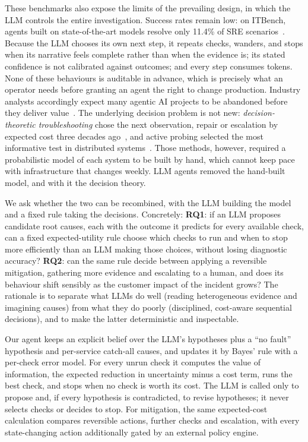 These benchmarks also expose the limits of the prevailing design, in which the LLM
controls the entire investigation. Success rates remain low: on ITBench, agents built on state-of-the-art models
resolve only 11.4\% of SRE scenarios~\cite{jha2025itbench}.
Because the LLM chooses its own next step, it repeats checks, wanders, and stops
when its narrative feels complete rather than when the evidence is; its stated
confidence is not calibrated against outcomes; and every step consumes tokens.
None of these behaviours is auditable in advance, which is precisely what an
operator needs before granting an agent the right to change production. Industry
analysts accordingly expect many agentic AI projects to be abandoned before they
deliver value~\cite{gartner2025agentic}. The underlying decision problem is not new:
\emph{decision-theoretic troubleshooting} chose the next observation, repair or
escalation by expected cost three decades ago~\cite{heckerman1995decision,breese1996decision,langseth2003decision},
and active probing selected the most informative test in distributed
systems~\cite{rish2005adaptive}. Those methods, however, required a probabilistic
model of each system to be built by hand, which cannot keep pace with
infrastructure that changes weekly. LLM agents removed the hand-built model, and
with it the decision theory.

We ask whether the two can be recombined, with the LLM building the model and a
fixed rule taking the decisions. Concretely:
\textbf{RQ1}: if an LLM proposes candidate root causes, each with the outcome it
predicts for every available check, can a fixed expected-utility rule choose which
checks to run and when to stop more efficiently than an LLM making those choices,
without losing diagnostic accuracy?
\textbf{RQ2}: can the same rule decide between applying a reversible mitigation,
gathering more evidence and escalating to a human, and does its behaviour shift
sensibly as the customer impact of the incident grows?
The rationale is to separate what LLMs do well (reading heterogeneous evidence and
imagining causes) from what they do poorly (disciplined, cost-aware sequential
decisions), and to make the latter deterministic and inspectable.

Our agent keeps an explicit belief over the LLM's hypotheses plus a ``no fault''
hypothesis and per-service catch-all causes, and updates it by Bayes' rule with a
per-check error model. For every unrun check it computes the value of information,
the expected reduction in uncertainty minus a cost term, runs the best check, and
stops when no check is worth its cost. The LLM is called only to propose and, if
every hypothesis is contradicted, to revise hypotheses; it never selects checks
or decides to stop. For mitigation, the same expected-cost calculation compares
reversible actions, further checks and escalation, with every state-changing
action additionally gated by an external policy engine.

